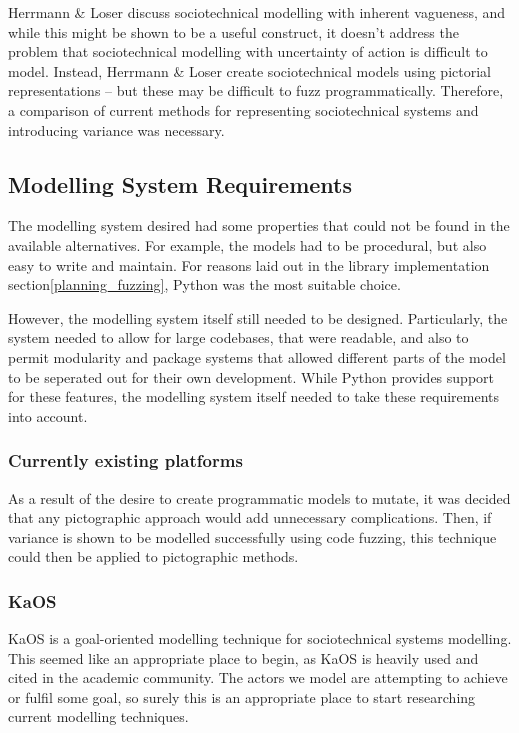 \documentclass{sig-alternate}
\begin{document}

\label{related_head}
Herrmann \& Loser\cite{Herrmann1999} discuss sociotechnical modelling with inherent vagueness, and while this might be shown to be a useful construct, it doesn't address the problem that sociotechnical modelling with uncertainty of action is difficult to model. Instead, Herrmann \& Loser create sociotechnical models using pictorial representations -- but these may be difficult to fuzz programmatically. Therefore, a comparison of current methods for representing sociotechnical systems and introducing variance was necessary. \par

\subsection{Modelling System Requirements}\label{planning_modelling_requirements}
The modelling system desired had some properties that could not be found in the available alternatives. For example, the models had to be procedural, but also easy to write and maintain. For reasons laid out in the library implementation section\cref{planning_fuzzing}, Python was the most suitable choice. \par

However, the modelling system itself still needed to be designed. Particularly, the system needed to allow for large codebases, that were readable, and also to permit modularity and package systems that allowed different parts of the model to be seperated out for their own development. While Python provides support for these features, the modelling system itself needed to take these requirements into account.  \par

\subsubsection{Currently existing platforms}
As a result of the desire to create programmatic models to mutate, it was decided that any pictographic approach would add unnecessary complications. Then, if variance is shown to be modelled successfully using code fuzzing, this technique could then be applied to pictographic methods. \par

\subsubsection{KaOS} 
KaOS is a goal-oriented modelling technique for sociotechnical systems modelling\cite{Werneck2009}. This seemed like an appropriate place to begin, as KaOS is heavily used and cited in the academic community. The actors we model are attempting to achieve or fulfil some goal, so surely this is an appropriate place to start researching current modelling techniques.\par
\end{document}
